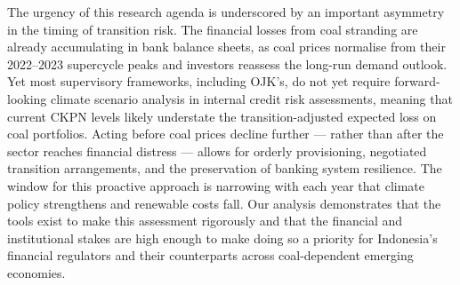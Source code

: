 The urgency of this research agenda is underscored by an important asymmetry in the timing of transition risk. The financial losses from coal stranding are already accumulating in bank balance sheets, as coal prices normalise from their 2022--2023 supercycle peaks and investors reassess the long-run demand outlook. Yet most supervisory frameworks, including OJK's, do not yet require forward-looking climate scenario analysis in internal credit risk assessments, meaning that current CKPN levels likely understate the transition-adjusted expected loss on coal portfolios. Acting before coal prices decline further --- rather than after the sector reaches financial distress --- allows for orderly provisioning, negotiated transition arrangements, and the preservation of banking system resilience. The window for this proactive approach is narrowing with each year that climate policy strengthens and renewable costs fall. Our analysis demonstrates that the tools exist to make this assessment rigorously and that the financial and institutional stakes are high enough to make doing so a priority for Indonesia's financial regulators and their counterparts across coal-dependent emerging economies.
